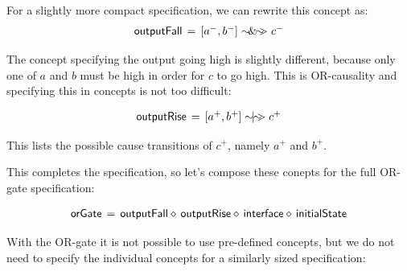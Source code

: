 \documentclass[british,conference,compsoc]{IEEEtran}
\begin{document}
For a slightly more compact specification, we can rewrite this concept as:
\[
\begin{array}{lcl}
\mathsf{outputFall}&\hspace{-2mm}=&\hspace{-2mm}[a^{-}, b^{-}] \sim\hspace{-1.5mm}\&\hspace{-1.5mm}\sim\hspace{-1.5mm}> c^{-} 
\end{array}
\]

\noindent The concept specifying the output going high is slightly different, because only one of
$a$ and $b$ must be high in order for $c$ to go high. This is OR-causality and specifying 
this in concepts is not too difficult: 
                                                                                                                                                                                                                                                                                                                                                        
\[
\begin{array}{lcl}
\mathsf{outputRise}&\hspace{-2mm}=&\hspace{-2mm}[a^{+}, b^{+}] \sim\hspace{-1.5mm}|\hspace{-1.5mm}\sim\hspace{-1.5mm}> c^{+} 
\end{array}
\]

\noindent This lists the possible cause transitions of $c^{+}$, namely $a^{+}$ and $b^{+}$. 

This completes the specification, so let's compose these conepts for the full OR-gate
specification:

\[
\begin{array}{lcl}
\mathsf{orGate}&\hspace{-2mm}=&\hspace{-2mm}\mathsf{outputFall} \diamond\, \mathsf{outputRise} \diamond\, \mathsf{interface} 
\diamond\, \mathsf{initialState}
\end{array}
\]

\noindent With the OR-gate it is not possible to use pre-defined concepts, but we do not need to
specify the individual concepts for a similarly sized specification:
\end{document}
